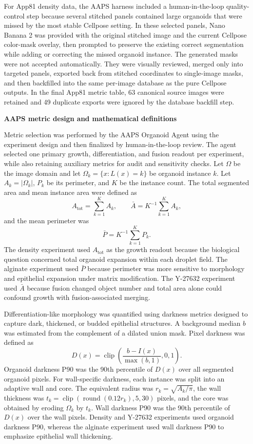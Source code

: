 \documentclass[
]{article}
\begin{document}
For App81 density data, the AAPS harness included a human-in-the-loop quality-control step because several stitched panels contained large organoids that were missed by the most stable Cellpose setting. In these selected panels, Nano Banana 2 was provided with the original stitched image and the current Cellpose color-mask overlay, then prompted to preserve the existing correct segmentation while adding or correcting the missed organoid instance. The generated masks were not accepted automatically. They were visually reviewed, merged only into targeted panels, exported back from stitched coordinates to single-image masks, and then backfilled into the same per-image database as the pure Cellpose outputs. In the final App81 metric table, 63 canonical source images were retained and 49 duplicate exports were ignored by the database backfill step.

\textbf{AAPS metric design and mathematical definitions}

Metric selection was performed by the AAPS Organoid Agent using the experiment design and then finalized by human-in-the-loop review. The agent selected one primary growth, differentiation, and fusion readout per experiment, while also retaining auxiliary metrics for audit and sensitivity checks. Let \(\Omega\) be the image domain and let \(\Omega_k=\{x:L(x)=k\}\) be organoid instance \(k\). Let \(A_k=|\Omega_k|\), \(P_k\) be its perimeter, and \(K\) be the instance count. The total segmented area and mean instance area were defined as
\[
A_{\mathrm{tot}}=\sum_{k=1}^{K}A_k, \qquad \bar{A}=K^{-1}\sum_{k=1}^{K}A_k,
\]
and the mean perimeter was
\[
\bar{P}=K^{-1}\sum_{k=1}^{K}P_k.
\]
The density experiment used \(A_{\mathrm{tot}}\) as the growth readout because the biological question concerned total organoid expansion within each droplet field. The alginate experiment used \(\bar{P}\) because perimeter was more sensitive to morphology and epithelial expansion under matrix modification. The Y-27632 experiment used \(\bar{A}\) because fusion changed object number and total area alone could confound growth with fusion-associated merging.

Differentiation-like morphology was quantified using darkness metrics designed to capture dark, thickened, or budded epithelial structures. A background median \(b\) was estimated from the complement of a dilated union mask. Pixel darkness was defined as
\[
D(x)=\operatorname{clip}\left(\frac{b-I(x)}{\max(b,1)},0,1\right).
\]
Organoid darkness P90 was the 90th percentile of \(D(x)\) over all segmented organoid pixels. For wall-specific darkness, each instance was split into an adaptive wall and core. The equivalent radius was \(r_k=\sqrt{A_k/\pi}\), the wall thickness was \(t_k=\operatorname{clip}(\operatorname{round}(0.12r_k),5,30)\) pixels, and the core was obtained by eroding \(\Omega_k\) by \(t_k\). Wall darkness P90 was the 90th percentile of \(D(x)\) over the wall pixels. Density and Y-27632 experiments used organoid darkness P90, whereas the alginate experiment used wall darkness P90 to emphasize epithelial wall thickening.
\end{document}
